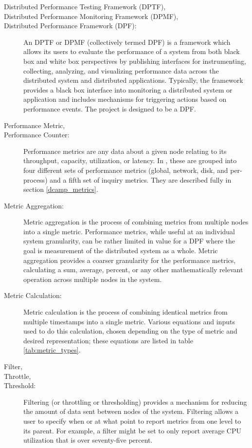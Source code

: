 \begin{description}

\item[Distributed Performance Testing Framework (DPTF),]
\item[Distributed Performance Monitoring Framework (DPMF),]
\item[Distributed Performance Framework (DPF):]

An DPTF or DPMF (collectively termed DPF) is a framework which allows its users to evaluate the performance of a system
from both black box and white box perspectives by publishing interfaces for instrumenting, collecting, analyzing, and
visualizing performance data across the distributed system and distributed applications. Typically, the framework
provides a black box interface into monitoring a distributed system or application and includes mechanisms for
triggering actions based on performance events. The \dcamp project is designed to be a DPF. 

\item[Performance Metric,]
\item[Performance Counter:]
Performance metrics are any data about a given node relating to its throughput, capacity, utilization, or latency. In
\dcamp, these are grouped into four different sets of performance metrics (global, network, disk, and per-process) and a
fifth set of inquiry metrics. They are described fully in section \ref{dcamp_metrics}. 

\item[Metric Aggregation:]
Metric aggregation is the process of combining metrics from multiple nodes into a single metric. Performance metrics,
while useful at an individual system granularity, can be rather limited in value for a DPF where the goal is measurement
of the distributed system as a whole. Metric aggregation provides a coarser granularity for the performance metrics,
calculating a sum, average, percent, or any other mathematically relevant operation across multiple nodes in the system. 

\item[Metric Calculation:]
Metric calculation is the process of combining identical metrics from multiple timestamps into a single metric. Various
equations and inputs used to do this calculation, chosen depending on the type of metric and desired representation;
these equations are listed in table \ref{tab:metric_types}.

\item[Filter,]
\item[Throttle,]
\item[Threshold:]
Filtering (or throttling or thresholding) provides a mechanism for reducing the amount of data sent between nodes of the
system. Filtering allows a user to specify when or at what point to report metrics from one level to its parent. For
example, a filter might be set to only report average CPU utilization that is over seventy-five percent. 


\end{description}
